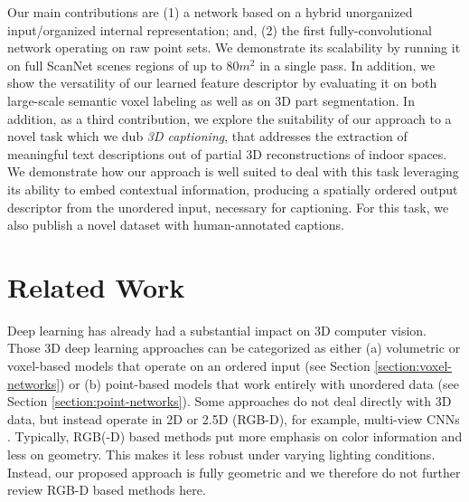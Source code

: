 \documentclass[runningheads]{llncs}
\begin{document}
Our main contributions are (1) a network based on a hybrid unorganized input/organized internal representation; and, (2) the first fully-convolutional network operating on raw point sets. We demonstrate its scalability by running it on full ScanNet scenes regions of up to $80m^2$ in a single pass. In addition, we show the versatility of our learned feature descriptor by evaluating it on both large-scale semantic voxel labeling as well as on 3D part segmentation. In addition, as a third contribution, we explore the suitability of our approach to a novel task which we dub \textit{3D captioning}, that addresses the extraction of meaningful text descriptions out of partial 3D reconstructions of indoor spaces.
We demonstrate how our approach is well suited to deal with this task leveraging its ability to embed contextual information, producing a spatially ordered output descriptor from the unordered input, necessary for captioning. For this task, we also publish a novel dataset with human-annotated captions.


\section{Related Work}

Deep learning has already had a substantial impact on 3D computer vision. Those 3D deep learning approaches can be categorized as either (a) volumetric or voxel-based models that operate on an ordered input (see Section \ref{section:voxel-networks}) or (b) point-based models that work entirely with unordered data (see Section \ref{section:point-networks}).
Some approaches do not deal directly with 3D data, but instead operate in 2D or 2.5D (RGB-D), for example, multi-view CNNs \cite{Su2015,Qi2016,Kaiming2017}. Typically, RGB(-D) based methods put more emphasis on color information and less on geometry. This makes it less robust under varying lighting conditions. Instead, our proposed approach is fully geometric and we therefore do not further review RGB-D based methods here.
\end{document}
